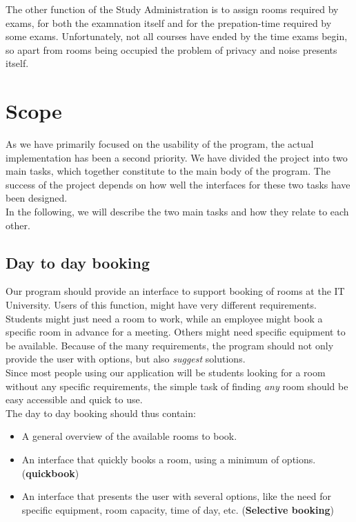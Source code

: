The other function of the Study Administration is to assign rooms required by exams, for both the examnation itself and for the prepation-time required by some exams. Unfortunately, not all courses have ended by the time exams begin, so apart from rooms being occupied the problem of privacy and noise presents itself.\\

\label{sec:scope}
\section{Scope}
As we have primarily focused on the usability of the program, the actual implementation has been a second priority. We have divided the project into two main tasks, which together constitute to the main body of the program. The success of the project depends on how well the interfaces for these two tasks have been designed.\\
In the following, we will describe the two main tasks and how they relate to each other.

\subsection{Day to day booking}
Our program should provide an interface to support booking of rooms at the IT University. Users of this function, might have very different requirements. Students might just need a room to work, while an employee might book a specific room in advance for a meeting. Others might need specific equipment to be available. Because of the many requirements, the program should not only provide the user with options, but also \emph{suggest} solutions.\\
Since most people using our application will be students looking for a room without any specific requirements, the simple task of finding \emph{any} room should be easy accessible and quick to use. \\

The day to day booking should thus contain:

\begin{itemize}
	\item A general overview of the available rooms to book.
	\item An interface that quickly books a room, using a minimum of options. (\textbf{quickbook})
	\item An interface that presents the user with several options, like the need for specific equipment, room capacity, time of day, etc. (\textbf{Selective booking})
\end{itemize}

